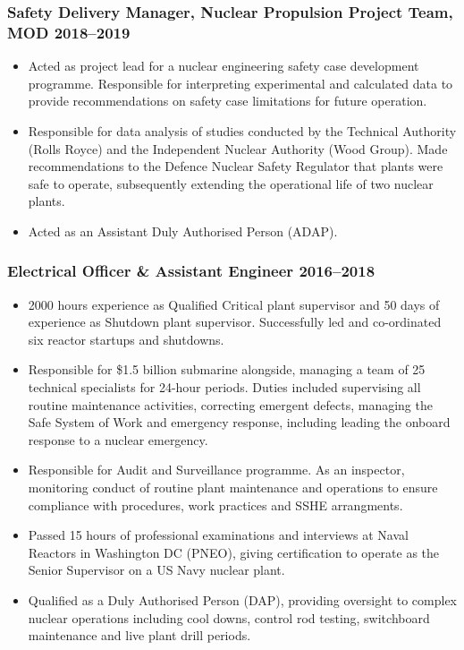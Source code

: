 \documentclass[a4paper, oneside, final, 11pt]{scrartcl} %
\begin{document}
\smallskip 

\subsubsection*{Safety Delivery Manager,  Nuclear Propulsion Project Team, MOD \hfill 2018--2019}  
\normalfont
\begin{itemize}

\item Acted as project lead for a nuclear engineering safety case development programme.  Responsible for interpreting experimental and calculated data to provide recommendations on safety case limitations for future operation.

\item Responsible for data analysis of studies conducted by the Technical Authority (Rolls Royce) and the Independent Nuclear Authority (Wood Group). Made recommendations to the Defence Nuclear Safety Regulator that plants were safe to operate,  subsequently extending the operational life of two nuclear plants.

\item Acted as an Assistant Duly Authorised Person (ADAP). 

\end{itemize}


				
\subsubsection*{Electrical Officer \& Assistant Engineer \hfill 2016--2018}  
\normalfont
\begin{itemize}

	 
	\item 2000 hours experience as Qualified Critical plant supervisor and 50 days of experience as Shutdown plant supervisor. Successfully led and co-ordinated six reactor startups and shutdowns.
	
\item  Responsible for \$1.5 billion submarine alongside, managing a team of 25 technical specialists for 24-hour periods. Duties included supervising all routine maintenance activities, correcting emergent defects, managing the Safe System of Work and emergency response, including leading the onboard response to a nuclear emergency.  
\item Responsible for Audit and Surveillance programme. As an inspector, monitoring conduct of routine plant maintenance and operations to ensure compliance with procedures, work practices and SSHE arrangments. 

\item Passed 15 hours of professional examinations and interviews at Naval Reactors in Washington DC (PNEO), giving certification to operate as the Senior Supervisor on a US Navy nuclear plant. 

\item Qualified as a Duly Authorised Person (DAP), providing oversight to complex nuclear operations including cool downs, control rod testing, switchboard maintenance and live plant drill periods.
\end{itemize}
\end{document}
